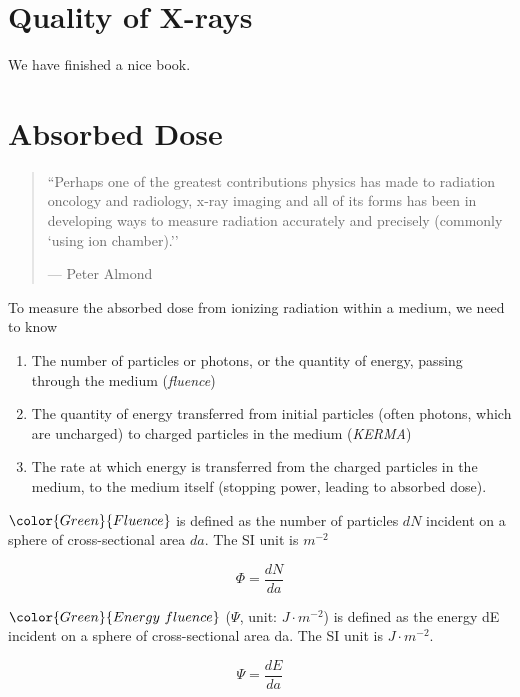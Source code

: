 \documentclass[]{book}
\providecommand{\tightlist}{%
  \setlength{\itemsep}{0pt}\setlength{\parskip}{0pt}}
\theoremstyle{definition}
\theoremstyle{definition}
\theoremstyle{definition}
\theoremstyle{remark}
\begin{document}
\chapter{Quality of X-rays}\label{quality}

We have finished a nice book.

\chapter{Absorbed Dose}\label{dose}

\begin{quote}
``Perhaps one of the greatest contributions physics has made to
radiation oncology and radiology, x-ray imaging and all of its forms has
been in developing ways to measure radiation accurately and precisely
(commonly `using ion chamber).''

--- Peter Almond
\end{quote}

To measure the absorbed dose from ionizing radiation within a medium, we
need to know

\begin{enumerate}
\def\labelenumi{\arabic{enumi}.}
\tightlist
\item
  The number of particles or photons, or the quantity of energy, passing
  through the medium (\emph{fluence})
\item
  The quantity of energy transferred from initial particles (often
  photons, which are uncharged) to charged particles in the medium
  (\emph{KERMA})
\item
  The rate at which energy is transferred from the charged particles in
  the medium, to the medium itself (stopping power, leading to absorbed
  dose).
\end{enumerate}

\(\color{Green}{Fluence}\) is defined as the number of particles \(dN\)
incident on a sphere of cross-sectional area \(da\). The SI unit is
\(m^{-2}\)

\begin{equation}
    \Phi = \frac{dN}{da}
    \label{eq:fluence}
\end{equation}

\(\color{Green}{Energy\ fluence}\) (\(\Psi\), unit: \(J\cdot m^{-2}\))
is defined as the energy dE incident on a sphere of cross-sectional area
da. The SI unit is \(J\cdot m^{-2}\).

\begin{equation}
    \Psi = \frac{dE}{da}
    \label{eq:efluence}
\end{equation}
\end{document}
